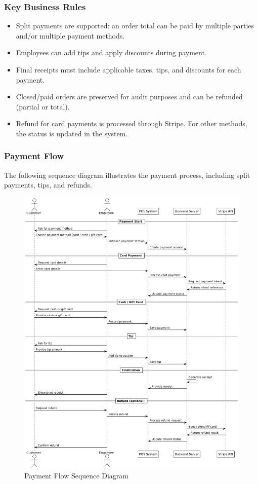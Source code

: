 \documentclass[]{VUMIFTemplateClass}
\begin{document}
\subsubsection{Key Business Rules}
\begin{itemize}
\item Split payments are supported: an order total can be paid by multiple parties and/or multiple payment methods.
\item Employees can add tips and apply discounts during payment.
\item Final receipts must include applicable taxes, tips, and discounts for each payment.
\item Closed/paid orders are preserved for audit purposes and can be refunded (partial or total).
\item Refund for card payments is processed through Stripe. For other methods, the status is updated in the system.
\end{itemize}

\subsubsection{Payment Flow}
The following sequence diagram illustrates the payment process, including split payments, tips, and refunds.

\begin{figure}[H]
    \centering
    \includegraphics[width=1\textwidth]{images/diagrams/payment/payment_flow.png}
    \caption{Payment Flow Sequence Diagram}
    \label{fig:payment_flow}
\end{figure}
\end{document}
